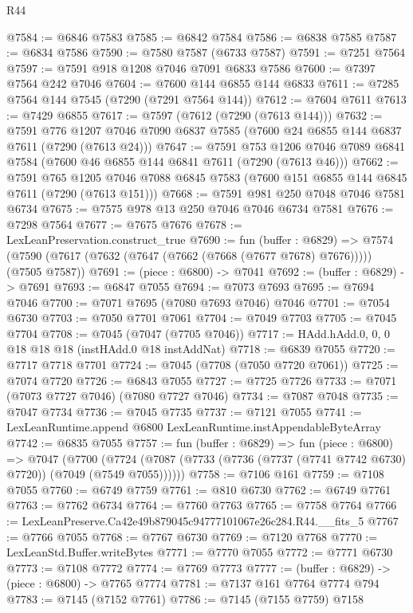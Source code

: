 \begin{lexlean}{R44}
\begin{coremodule}
{@7584 := @6846 @7583
@7585 := @6842 @7584
@7586 := @6838 @7585
@7587 := @6834 @7586
@7590 := @7580 @7587 (@6733 @7587)
@7591 := @7251 @7564
@7597 := @7591 @918 @1208 @7046 @7091 @6833 @7586
@7600 := @7397 @7564 @242 @7046
@7604 := @7600 @144 @6855 @144 @6833
@7611 := @7285 @7564 @144 @7545 (@7290 (@7291 @7564 @144))
@7612 := @7604 @7611
@7613 := @7429 @6855
@7617 := @7597 (@7612 (@7290 (@7613 @144)))
@7632 := @7591
    @776
    @1207
    @7046
    @7090
    @6837
    @7585
    (@7600 @24 @6855 @144 @6837 @7611 (@7290 (@7613 @24)))
@7647 := @7591
    @753
    @1206
    @7046
    @7089
    @6841
    @7584
    (@7600 @46 @6855 @144 @6841 @7611 (@7290 (@7613 @46)))
@7662 := @7591
    @765
    @1205
    @7046
    @7088
    @6845
    @7583
    (@7600 @151 @6855 @144 @6845 @7611 (@7290 (@7613 @151)))
@7668 := @7591 @981 @250 @7048 @7046 @7581 @6734
@7675 := @7575 @978 @13 @250 @7046 @7046 @6734 @7581
@7676 := @7298 @7564
@7677 := @7675 @7676
@7678 := LexLeanPreservation.construct_true
@7690 := fun (buffer : @6829) =>
  @7574 (@7590 (@7617 (@7632 (@7647 (@7662 (@7668 (@7677 @7678) @7676))))) (@7505 @7587))
@7691 := (piece : @6800) -> @7041
@7692 := (buffer : @6829) -> @7691
@7693 := @6847 @7055
@7694 := @7073 @7693
@7695 := @7694 @7046
@7700 := @7071 @7695 (@7080 @7693 @7046) @7046
@7701 := @7054 @6730
@7703 := @7050 @7701 @7061
@7704 := @7049 @7703
@7705 := @7045 @7704
@7708 := @7045 (@7047 (@7705 @7046))
@7717 := HAdd.hAdd.{0, 0, 0} @18 @18 @18 (instHAdd.{0} @18 instAddNat)
@7718 := @6839 @7055
@7720 := @7717 @7718 @7701
@7724 := @7045 (@7708 (@7050 @7720 @7061))
@7725 := @7074 @7720
@7726 := @6843 @7055
@7727 := @7725 @7726
@7733 := @7071 (@7073 @7727 @7046) (@7080 @7727 @7046)
@7734 := @7087 @7048
@7735 := @7047 @7734
@7736 := @7045 @7735
@7737 := @7121 @7055
@7741 := LexLeanRuntime.append @6800 LexLeanRuntime.instAppendableByteArray
@7742 := @6835 @7055
@7757 := fun (buffer : @6829) =>
  fun (piece : @6800) =>
  @7047
    (@7700 (@7724 (@7087 (@7733 (@7736 (@7737 (@7741 @7742 @6730) @7720)) (@7049 (@7549 @7055))))))
@7758 := @7106 @161
@7759 := @7108 @7055
@7760 := @6749 @7759
@7761 := @810 @6730
@7762 := @6749 @7761
@7763 := @7762 @6734
@7764 := @7760 @7763
@7765 := @7758 @7764
@7766 := LexLeanPreserve.Ca42e49b879045c94777101067e26c284.R44.__fits_5
@7767 := @7766 @7055
@7768 := @7767 @6730
@7769 := @7120 @7768
@7770 := LexLeanStd.Buffer.writeBytes
@7771 := @7770 @7055
@7772 := @7771 @6730
@7773 := @7108 @7772
@7774 := @7769 @7773
@7777 := (buffer : @6829) -> (piece : @6800) -> @7765 @7774
@7781 := @7137 @161 @7764 @7774 @794
@7783 := @7145 (@7152 @7761)
@7786 := @7145 (@7155 @7759) @7158
}
\end{coremodule}
\end{lexlean}
